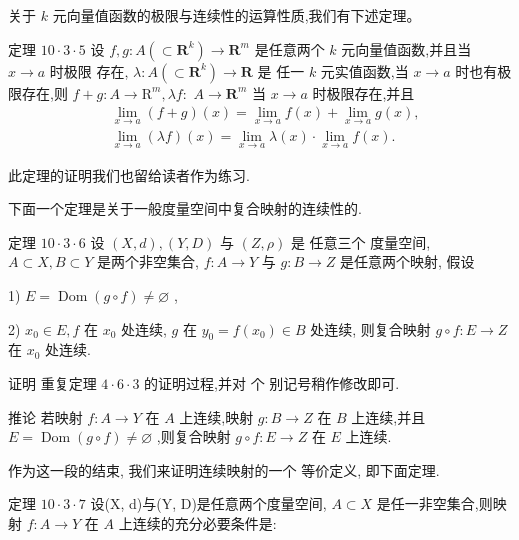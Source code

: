关于 $k$ 元向量值函数的极限与连续性的运算性质,我们有下述定理。

定理 ${10} \cdot  3 \cdot  5$ 设 $f,g : A\left( { \subset  {\mathbf{R}}^{k}}\right)  \rightarrow  {\mathbf{R}}^{m}$ 是任意两个 $k$ 元向量值函数,并且当 $x \rightarrow  a$ 时极限 存在, $\lambda  : A\left( { \subset  {\mathbf{R}}^{k}}\right)  \rightarrow  \mathbf{R}$ 是 任一 $k$ 元实值函数,当 $x \rightarrow  a$ 时也有极限存在,则 $f + g : A \rightarrow  {\mathrm{R}}^{m},{\lambda f} :$  $A \rightarrow  {\mathbf{R}}^{m}$ 当 $x \rightarrow  a$ 时极限存在,并且
\begin{align*}
	&\mathop{\lim }\limits_{{x \rightarrow  a}}\left( {f + g}\right) \left( x\right)  = \mathop{\lim }\limits_{{x \rightarrow  a}}f\left( x\right)  + \mathop{\lim }\limits_{{x \rightarrow  a}}g\left( x\right) ,\\
	&\mathop{\lim }\limits_{{x \rightarrow  a}}\left( {\lambda f}\right) \left( x\right)  = \mathop{\lim }\limits_{{x \rightarrow  a}}\lambda \left( x\right)  \cdot  \mathop{\lim }\limits_{{x \rightarrow  a}}f\left( x\right) .
\end{align*}

此定理的证明我们也留给读者作为练习.

下面一个定理是关于一般度量空间中复合映射的连续性的.

定理 ${10} \cdot  3 \cdot  6$ 设 $\left( {X,d}\right) ,\left( {Y,D}\right)$ 与 $\left( {Z,\rho }\right)$ 是 任意三个 度量空间, $A \subset  X,B \subset  Y$ 是两个非空集合, $f : A \rightarrow  Y$ 与 $g : B \rightarrow  Z$ 是任意两个映射, 假设

1) $E = \operatorname{Dom}\left( {g \circ  f}\right)  \neq  \varnothing$ ,

2) ${x}_{0} \in  E,f$ 在 ${x}_{0}$ 处连续, $g$ 在 ${y}_{0} = f\left( {x}_{0}\right)  \in  B$ 处连续, 则复合映射 $g \circ  f : E \rightarrow  Z$ 在 ${x}_{0}$ 处连续.

证明 重复定理 $4 \cdot  6 \cdot  3$ 的证明过程,并对 个 别记号稍作修改即可.

推论 若映射 $f : A \rightarrow  Y$ 在 $A$ 上连续,映射 $g : B \rightarrow  Z$ 在 $B$ 上连续,并且 $E = \operatorname{Dom}\left( {g \circ  f}\right)  \neq  \varnothing$ ,则复合映射 $g \circ  f : E \rightarrow  Z$ 在 $E$ 上连续.

作为这一段的结束, 我们来证明连续映射的一个 等价定义, 即下面定理.

定理 ${10} \cdot  3 \cdot  7$ 设(X, d)与(Y, D)是任意两个度量空间, $A \subset  X$ 是任一非空集合,则映射 $f : A \rightarrow  Y$ 在 $A$ 上连续的充分必要条件是:

